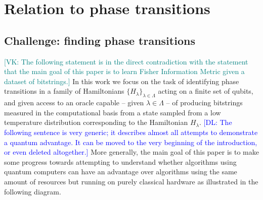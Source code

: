 \documentclass[american,aps,pra,reprint,floatfix,nofootinbib,superscriptaddress]{revtex4-2}
\newcommand{\VK}[1]{\textcolor{teal}{[VK: #1]}}
\newcommand{\DL}[1]{\textcolor{blue}{[DL: #1]}}
\begin{document}
\section{Relation to phase transitions}
\subsection{Challenge: finding phase transitions}


\VK{The following statement is in the direct contradiction with the statement
that the main goal of this paper is to learn Fisher Information Metric
given a dataset of bitstrings.}
In this work we focus on the task of identifying phase transitions in a
family of Hamiltonians $\{H_{\lambda}\}_{\lambda \in \Lambda}$ acting on a finite
set of qubits, and given access to an oracle capable -- given $\lambda \in \Lambda$ --
of producing bitstrings measured in the computational basis from a state sampled
from a low temperature distribution corresponding to the Hamiltonian
$H_{\lambda}$. 
\DL{The following sentence is very generic; it describes almost all attempts to demonstrate a quantum advantage. It can be moved to the very beginning of the introduction, or even deleted altogether.}
More generally,
the main goal of this paper is to make some
progress towards attempting to understand whether algorithms using
quantum computers can have an advantage over algorithms using the
same amount of resources but running on
purely classical hardware as illustrated in the following diagram.
\end{document}
